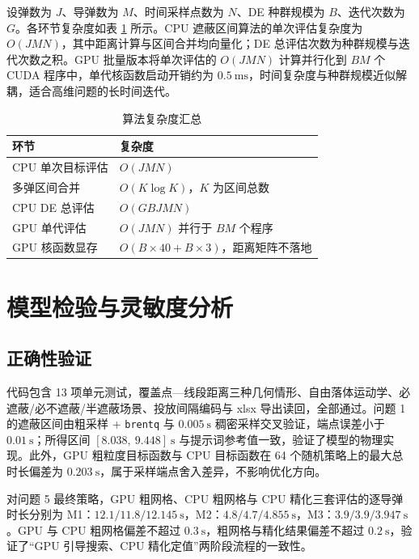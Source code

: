 \documentclass[11pt,a4paper]{ctexart}
\begin{document}
设弹数为 $J$、导弹数为 $M$、时间采样点数为 $N$、DE 种群规模为 $B$、迭代次数为 $G$。各环节复杂度如表 \ref{tab:complexity} 所示。CPU 遮蔽区间算法的单次评估复杂度为 $O(JMN)$，其中距离计算与区间合并均向量化；DE 总评估次数为种群规模与迭代次数之积。GPU 批量版本将单次评估的 $O(JMN)$ 计算并行化到 $BM$ 个 CUDA 程序中，单代核函数启动开销约为 $0.5~\mathrm{ms}$，时间复杂度与种群规模近似解耦，适合高维问题的长时间迭代。

\begin{table}[H]
\centering
\caption{算法复杂度汇总}
\label{tab:complexity}
\small
\begin{tabular}{ll}
\toprule
环节 & 复杂度 \\
\midrule
CPU 单次目标评估 & $O(JMN)$ \\
多弹区间合并 & $O(K\log K)$，$K$ 为区间总数 \\
CPU DE 总评估 & $O(GBJMN)$ \\
GPU 单代评估 & $O(JMN)$ 并行于 $BM$ 个程序 \\
GPU 核函数显存 & $O(B\times 40 + B\times 3)$，距离矩阵不落地 \\
\bottomrule
\end{tabular}
\end{table}

\section{模型检验与灵敏度分析}

\subsection{正确性验证}

代码包含 13 项单元测试，覆盖点—线段距离三种几何情形、自由落体运动学、必遮蔽/必不遮蔽/半遮蔽场景、投放间隔编码与 xlsx 导出读回，全部通过。问题 1 的遮蔽区间由粗采样 + \texttt{brentq} 与 $0.005~\mathrm{s}$ 稠密采样交叉验证，端点误差小于 $0.01~\mathrm{s}$；所得区间 $[8.038,\ 9.448]~\mathrm{s}$ 与提示词参考值一致，验证了模型的物理实现。此外，GPU 粗粒度目标函数与 CPU 目标函数在 64 个随机策略上的最大总时长偏差为 $0.203~\mathrm{s}$，属于采样端点舍入差异，不影响优化方向。

对问题 5 最终策略，GPU 粗网格、CPU 粗网格与 CPU 精化三套评估的逐导弹时长分别为 M1：$12.1/11.8/12.145~\mathrm{s}$，M2：$4.8/4.7/4.855~\mathrm{s}$，M3：$3.9/3.9/3.947~\mathrm{s}$。GPU 与 CPU 粗网格偏差不超过 $0.3~\mathrm{s}$，粗网格与精化结果偏差不超过 $0.2~\mathrm{s}$，验证了“GPU 引导搜索、CPU 精化定值”两阶段流程的一致性。
\end{document}
